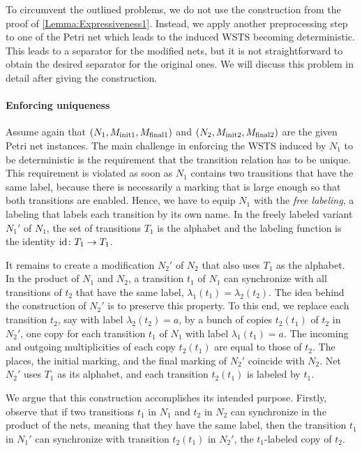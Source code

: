 \documentclass[../../diss.tex]{subfiles}
\begin{document}
To circumvent the outlined problems, we do not use the construction from the proof of \cref{Lemma:Expressiveness1}.
Instead, we apply another preprocessing step to one of the Petri net which leads to the induced WSTS becoming deterministic.
This leads to a separator for the modified nets, but it is not straightforward to obtain the desired separator for the original ones.
We will discuss this problem in detail after giving the construction.

\paragraph{Enforcing uniqueness}

Assume again that $(N_1,M_{{\text{init}}1},M_{{\text{final}}1})$ and $(N_2,M_{{\text{init}}2},M_{{\text{final}}2})$ are the given Petri net instances.
The main challenge in enforcing the WSTS induced by $N_1$ to be deterministic is the requirement that the transition relation has to be unique.
This requirement is violated as soon as $N_1$ contains two transitions that have the same label, because there is necessarily a marking that is large enough so that both transitions are enabled.
Hence, we have to equip $N_1$ with the \emph{free labeling}, a labeling that labels each transition by its own name.
In the freely labeled variant $N_1'$ of $N_1$, the set of transitions $T_1$ is the alphabet and the labeling function is the identity $\text{id} \colon T_1 \to T_1$.

It remains to create a modification $N_2'$ of $N_2$ that also uses $T_1$ as the alphabet.
In the product of $N_1$ and $N_2$, a transition $t_1$ of $N_1$ can synchronize with all transitions of $t_2$ that have the same label, $\lambda_1(t_1) = \lambda_2(t_2)$.
The idea behind the construction of $N_2'$ is to preserve this property.
To this end, we replace each transition $t_2$, say with label $\lambda_2(t_2) = a$, by a bunch of copies $t_2(t_1)$ of $t_2$ in $N_2'$, one copy for each transition $t_1$ of $N_1$ with label $\lambda_1(t_1) = a$.
The incoming and outgoing multiplicities of each copy $t_2(t_1)$ are equal to those of $t_2$.
The places, the initial marking, and the final marking of $N_2'$ coincide with $N_2$.
Net $N_2'$ uses $T_1$ as its alphabet, and each transition $t_2(t_1)$ is labeled by $t_1$.

We argue that this construction accomplishes its intended purpose.
Firstly, observe that if two transitions $t_1$ in $N_1$ and $t_2$ in $N_2$ can synchronize in the product of the nets, meaning that they have the same label, then the transition $t_1$ in $N_1'$ can synchronize with transition $t_2(t_1)$ in $N_2'$, the $t_1$-labeled copy of $t_2$.
\end{document}
